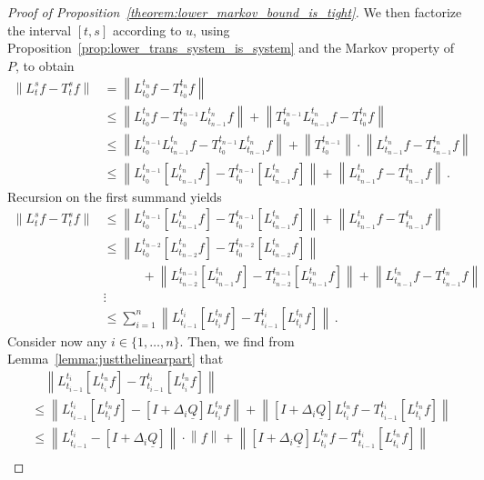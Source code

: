 \documentclass[10pt]{paper}
\theoremstyle{definition}
\newcommand{\lrate}{\underline{Q}}
\newcommand{\norm}[1]{\left\lVert #1 \right\rVert}
\begin{document}
\begin{proof}[Proof of Proposition~\ref{theorem:lower_markov_bound_is_tight}]
We then factorize the interval $[t,s]$ according to $u$, using Proposition~\ref{prop:lower_trans_system_is_system} and the Markov property of $P$, to obtain
\begin{align*}
\norm{L_t^sf - T_t^sf} &= \norm{L_{t_0}^{t_n}f - T_{t_0}^{t_n}f} \\
 &\leq \norm{L_{t_0}^{t_n}f - T_{t_0}^{t_{n-1}}L_{t_{n-1}}^{t_n}f} + \norm{T_{t_0}^{t_{n-1}}L_{t_{n-1}}^{t_n}f - T_{t_0}^{t_n}f} \\
 &\leq \norm{L_{t_0}^{t_{n-1}}L_{t_{n-1}}^{t_n}f - T_{t_0}^{t_{n-1}}L_{t_{n-1}}^{t_n}f} + \norm{{T_{t_0}^{t_{n-1}}}}\cdot\norm{L_{t_{n-1}}^{t_n}f - T_{t_{n-1}}^{t_n}f} \\
 &\leq \norm{L_{t_0}^{t_{n-1}}\left[L_{t_{n-1}}^{t_n}f\right] - T_{t_0}^{t_{n-1}}\left[L_{t_{n-1}}^{t_n}f\right]} + \norm{L_{t_{n-1}}^{t_n}f - T_{t_{n-1}}^{t_n}f} \,.
\end{align*}
Recursion on the first summand yields
\begin{align*}
\norm{L_t^sf - T_t^sf} &\leq \norm{L_{t_0}^{t_{n-1}}\left[L_{t_{n-1}}^{t_n}f\right] - T_{t_0}^{t_{n-1}}\left[L_{t_{n-1}}^{t_n}f\right]} + \norm{L_{t_{n-1}}^{t_n}f - T_{t_{n-1}}^{t_n}f} \\
 &\leq \norm{L_{t_0}^{t_{n-2}}\left[L_{t_{n-2}}^{t_n}f\right] - T_{t_0}^{t_{n-2}}\left[L_{t_{n-2}}^{t_n}f\right]} \\
 &\quad\quad\quad+ \norm{L_{t_{n-2}}^{t_{n-1}}\left[L_{t_{n-1}}^{t_n}f\right] - T_{t_{n-2}}^{t_{n-1}}\left[L_{t_{n-1}}^{t_n}f\right]} + \norm{L_{t_{n-1}}^{t_n}f - T_{t_{n-1}}^{t_n}f} \\
&\vdots \\
 &\leq \sum_{i=1}^{n} \norm{L_{t_{i-1}}^{t_i}\left[L_{t_i}^{t_n}f\right] - T_{t_{i-1}}^{t_i}\left[L_{t_i}^{t_n}f\right]}\,.
\end{align*}
Consider now any $i\in\{1,\ldots,n\}$. Then, we find from Lemma~\ref{lemma:justthelinearpart} that
\begin{align*}
&\quad \norm{L_{t_{i-1}}^{t_i}\left[L_{t_i}^{t_n}f\right] - T_{t_{i-1}}^{t_i}\left[L_{t_i}^{t_n}f\right]} \\
&\leq \norm{L_{t_{i-1}}^{t_i}\left[L_{t_i}^{t_n}f\right] - \left[I+\Delta_i\lrate\right]L_{t_i}^{t_n}f} + \norm{\left[I+\Delta_i\lrate\right]L_{t_i}^{t_n}f - T_{t_{i-1}}^{t_i}\left[L_{t_i}^{t_n}f\right]} \\
&\leq \norm{L_{t_{i-1}}^{t_i} - \left[I+\Delta_i\lrate\right]}\cdot\norm{f} + \norm{\left[I+\Delta_i\lrate\right]L_{t_i}^{t_n}f - T_{t_{i-1}}^{t_i}\left[L_{t_i}^{t_n}f\right]} \\

\end{align*}
\end{proof}
\end{document}

